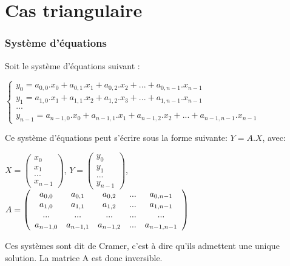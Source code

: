 

\section{Cas triangulaire} 

\begin{frame}[fragile]
\frametitle{Système d'équations}

Soit le système d'équations suivant :
\begin{center}
$\left\{\begin{array}{l}
y_0=a_{0,0}.x_0+a_{0,1}.x_1+a_{0,2}.x_2+...+a_{0,n-1}.x_{n-1} \\
y_1=a_{1,0}.x_1+a_{1,1}.x_2+a_{1,2}.x_3+...+a_{1,n-1}.x_{n-1} \\
...\\
y_{n-1}=a_{n-1,0}.x_0+a_{n-1,1}.x_1+a_{n-1,2}.x_2+...+a_{n-1,n-1}.x_{n-1}
\end{array}\right.$
\end{center}

Ce système d'équations peut s'écrire sous la forme suivante: $Y=A.X$, avec:\\
\begin{center}
$X=\left(\begin{array}{c}
x_0 \\ x_1 \\ ...\\ x_{n-1}
\end{array}\right)$,
$Y=\left(\begin{array}{c}
y_0 \\ y_1 \\ ...\\ y_{n-1}
\end{array}\right)$,
$A=\left(\begin{array}{c c c c c}
a_{0,0} & a_{0,1} & a_{0,2} & ... & a_{0,n-1} \\
a_{1,0} & a_{1,1} & a_{1,2} & ... & a_{1,n-1} \\
... & ... & ... & ... & ... \\
a_{n-1,0} & a_{n-1,1} & a_{n-1,2} & ... & a_{n-1,n-1}
\end{array}\right)$
\end{center}

Ces systèmes sont dit de Cramer, c'est à dire qu'ils admettent une unique solution. La matrice A est donc inversible.

\end{frame}


